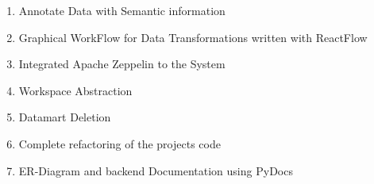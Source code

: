 \documentclass[12pt]{beamer}
\begin{document}
\begin{textblock}{0.5}
		\begin{enumerate}
			\item Annotate Data with Semantic information
			\item Graphical WorkFlow for Data Transformations written with ReactFlow
			\item Integrated Apache Zeppelin to the System
			\item Workspace Abstraction
			\item Datamart Deletion
			\item Complete refactoring of the projects code
			\item ER-Diagram and backend Documentation using PyDocs
		\end{enumerate}
		
		
		
	\end{textblock}
	
	
\end{document}
